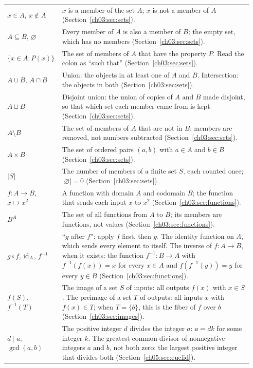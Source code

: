 \begin{longtable}{@{}p{1.25in}p{3.95in}@{}}
$x\in A$, $x\notin A$ & $x$ is a member of the set $A$; $x$ is not a member of $A$ (Section~\ref{ch03:sec:sets}).\\
$A\subseteq B$, $\varnothing$ & Every member of $A$ is also a member of $B$; the empty set, which has no members (Section~\ref{ch03:sec:sets}).\\
$\{x\in A:P(x)\}$ & The set of members of $A$ that have the property $P$. Read the colon as ``such that'' (Section~\ref{ch03:sec:sets}).\\
$A\cup B$, $A\cap B$ & Union: the objects in at least one of $A$ and $B$. Intersection: the objects in both (Section~\ref{ch03:sec:sets}).\\
$A\sqcup B$ & Disjoint union: the union of copies of $A$ and $B$ made disjoint, so that which set each member came from is kept (Section~\ref{ch03:sec:sets}).\\
$A\setminus B$ & The set of members of $A$ that are not in $B$: members are removed, not numbers subtracted (Section~\ref{ch03:sec:sets}).\\
$A\times B$ & The set of ordered pairs $(a,b)$ with $a\in A$ and $b\in B$ (Section~\ref{ch03:sec:sets}).\\
$|S|$ & The number of members of a finite set $S$, each counted once; $|\varnothing|=0$ (Section~\ref{ch03:sec:sets}).\\
$f:A\to B$, $x\mapsto x^2$ & A function with domain $A$ and codomain $B$; the function that sends each input $x$ to $x^2$ (Section~\ref{ch03:sec:functions}).\\
$B^A$ & The set of all functions from $A$ to $B$; its members are functions, not values (Section~\ref{ch03:sec:functions}).\\
$g\circ f$, $\operatorname{id}_A$, $f^{-1}$ & ``$g$ after $f$'': apply $f$ first, then $g$. The identity function on $A$, which sends every element to itself. The inverse of $f:A\to B$, when it exists: the function $f^{-1}:B\to A$ with $f^{-1}(f(x))=x$ for every $x\in A$ and $f(f^{-1}(y))=y$ for every $y\in B$ (Section~\ref{ch03:sec:functions}).\\
$f(S)$, $f^{-1}(T)$ & The image of a set $S$ of inputs: all outputs $f(x)$ with $x\in S$. The preimage of a set $T$ of outputs: all inputs $x$ with $f(x)\in T$; when $T=\{b\}$, this is the fiber of $f$ over $b$ (Section~\ref{ch03:sec:images}).\\
$d\mid a$, $\gcd(a,b)$ & The positive integer $d$ divides the integer $a$: $a=dk$ for some integer $k$. The greatest common divisor of nonnegative integers $a$ and $b$, not both zero: the largest positive integer that divides both (Section~\ref{ch05:sec:euclid}).\\

\end{longtable}
